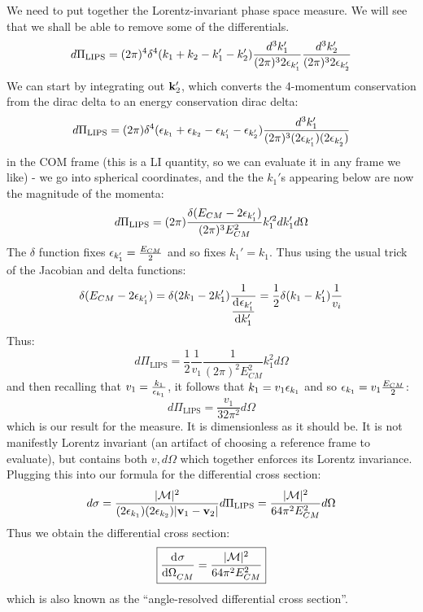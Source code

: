 We need to put together the Lorentz-invariant phase space measure. We will see that we shall be able to remove some of the differentials.
\begin{equation}
    d\Pi_{\text{LIPS}} = (2\pi)^4\delta^4(k_1 + k_2 - k_1' - k_2')\frac{d^3k_1'}{(2\pi)^32\epsilon_{k_1'}}\frac{d^3k_2'}{(2\pi)^32\epsilon_{k_2'}}
\end{equation}
We can start by integrating out $\mathbf{k}_2'$, which converts the 4-momentum conservation from the dirac delta to an energy conservation dirac delta:
\begin{equation}
    d\Pi_{\text{LIPS}} = (2\pi)\delta^4(\epsilon_{k_1} + \epsilon_{k_2} - \epsilon_{k_1'} - \epsilon_{k_2'})\frac{d^3k_1'}{(2\pi)^3(2\epsilon_{k_1'})(2\epsilon_{k_2'})}
\end{equation}
in the COM frame (this is a LI quantity, so we can evaluate it in any frame we like) - we go into spherical coordinates, and the the $k_1'$s appearing below are now the magnitude of the momenta:
\begin{equation}
    d\Pi_{\text{LIPS}} = (2\pi)\frac{\delta(E_{CM} - 2\epsilon_{k_1'})}{(2\pi)^3E^2_{CM}}k_1'^2 dk_1' d\Omega
\end{equation}
The $\delta$ function fixes $\epsilon_{k_1'} = \frac{E_{CM}}{2}$ and so fixes $k_1' = k_1$. Thus using the usual trick of the Jacobian and delta functions:
\begin{equation}
    \delta(E_{CM} - 2\e_{k_1'}) = \delta(2k_1 - 2k_1')\frac{1}{\dod{\e_{k_1'}}{k_1'}} = \frac{1}{2}\delta(k_1 -k_1')\frac{1}{v_i}
\end{equation}
Thus:
\begin{equation}
    d\Pi_{\text{LIPS}} = \frac{1}{2}\frac{1}{v_1}\frac{1}{(2\pi)^2E_{CM}^2}k_1^2d\Omega
\end{equation}
and then recalling that $v_1 = \frac{k_1}{\epsilon_{k_1}}$, it follows that $k_1 = v_1\epsilon_{k_1}$ and so $\epsilon_{k_1} = v_1\frac{E_{CM}}{2}$:
\begin{equation}
    d\Pi_{\text{LIPS}} = \frac{v_1}{32\pi^2}d\Omega
\end{equation}
which is our result for the measure. It is dimensionless as it should be. It is not manifestly Lorentz invariant (an artifact of choosing a reference frame to evaluate), but contains both $v, d\Omega$ which together enforces its Lorentz invariance. Plugging this into our formula for the differential cross section:
\begin{equation}
    d\sigma = \frac{\lvert \mathcal{M} \rvert^2}{(2\epsilon_{k_1})(2\epsilon_{k_2})\lvert \mathbf{v}_1 - \mathbf{v}_2 \rvert}d\Pi_{\text{LIPS}} = \frac{\lvert \mathcal{M} \rvert^2}{64\pi^2E_{CM}^2}d\Omega
\end{equation}
Thus we obtain the differential cross section:
\begin{equation}
    \boxed{\dod{\sigma}{\Omega_{CM}} = \frac{\abs{\mathcal{M}}^2}{64\pi^2 E_{CM}^2}}
\end{equation}
which is also known as the ``angle-resolved differential cross section''.

